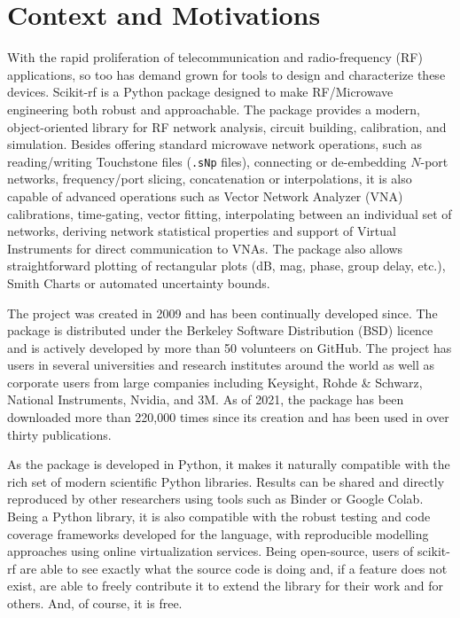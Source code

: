 \documentclass[journal, onecolumn]{IEEEtran}
\begin{document}
\section{Context and Motivations}
With the rapid proliferation of telecommunication and radio-frequency (RF) applications, so too has demand grown for tools to design and characterize these devices. Scikit-rf is a Python package designed to make RF/Microwave engineering both robust and approachable. The package provides a modern, object-oriented library for RF network analysis, circuit building, calibration, and simulation. Besides offering standard microwave network operations, such as reading/writing Touchstone files (\texttt{.sNp} files), connecting or de-embedding $N$-port networks, frequency/port slicing, concatenation or interpolations, it is also capable of advanced operations such as Vector Network Analyzer (VNA) calibrations, time-gating, vector fitting, interpolating between an individual set of networks, deriving network statistical properties and support of Virtual Instruments for direct communication to VNAs. The package also allows straightforward plotting of rectangular plots (dB, mag, phase, group delay, etc.), Smith Charts or automated uncertainty bounds.
 
The project was created in 2009 and has been continually developed since. The package is distributed under the Berkeley Software Distribution (BSD) licence and is actively developed by more than 50 volunteers on GitHub. The project has users in several universities and research institutes around the world as well as corporate users from large companies including Keysight, Rohde \& Schwarz, National Instruments, Nvidia, and 3M. As of 2021, the package has been downloaded more than 220,000 times since its creation and has been used in over thirty publications.

As the package is developed in Python, it makes it naturally compatible with the rich set of modern scientific Python libraries. Results can be shared and directly reproduced by other researchers using tools such as Binder or Google Colab. Being a Python library, it is also compatible with the robust testing and code coverage frameworks developed for the language, with reproducible modelling approaches using online virtualization services. Being open-source, users of scikit-rf are able to see exactly what the source code is doing and, if a feature does not exist, are able to freely contribute it to extend the library for their work and for others. And, of course, it is free.
\end{document}
